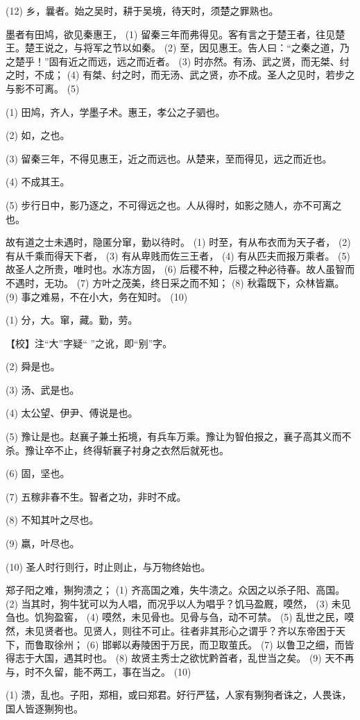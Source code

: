 \documentclass[12pt,UTF8]{ctexbook}
\begin{document}
(12) 乡，曩者。始之吴时，耕于吴境，待天时，须楚之罪熟也。

墨者有田鸠，欲见秦惠王， (1) 留秦三年而弗得见。客有言之于楚王者，往见楚王。楚王说之，与将军之节以如秦。 (2) 至，因见惠王。告人曰：“之秦之道，乃之楚乎！”固有近之而远，远之而近者。 (3) 时亦然。有汤、武之贤，而无桀、纣之时，不成； (4) 有桀、纣之时，而无汤、武之贤，亦不成。圣人之见时，若步之与影不可离。 (5)

(1) 田鸠，齐人，学墨子术。惠王，孝公之子驷也。

(2) 如，之也。

(3) 留秦三年，不得见惠王，近之而远也。从楚来，至而得见，远之而近也。

(4) 不成其王。

(5) 步行日中，影乃逐之，不可得远之也。人从得时，如影之随人，亦不可离之也。

故有道之士未遇时，隐匿分窜，勤以待时。 (1) 时至，有从布衣而为天子者， (2) 有从千乘而得天下者， (3) 有从卑贱而佐三王者， (4) 有从匹夫而报万乘者。 (5) 故圣人之所贵，唯时也。水冻方固， (6) 后稷不种，后稷之种必待春。故人虽智而不遇时，无功。 (7) 方叶之茂美，终日采之而不知； (8) 秋霜既下，众林皆羸。 (9) 事之难易，不在小大，务在知时。 (10)

(1) 分，大。窜，藏。勤，劳。

【校】注“大”字疑“ ”之讹，即“别”字。

(2) 舜是也。

(3) 汤、武是也。

(4) 太公望、伊尹、傅说是也。

(5) 豫让是也。赵襄子兼土拓境，有兵车万乘。豫让为智伯报之，襄子高其义而不杀。豫让卒不止，终得斩襄子衬身之衣然后就死也。

(6) 固，坚也。

(7) 五稼非春不生。智者之功，非时不成。

(8) 不知其叶之尽也。

(9) 羸，叶尽也。

(10) 圣人时行则行，时止则止，与万物终始也。

郑子阳之难，猘狗溃之； (1) 齐高国之难，失牛溃之。众因之以杀子阳、高国。 (2) 当其时，狗牛犹可以为人唱，而况乎以人为唱乎？饥马盈厩，嗼然， (3) 未见刍也。饥狗盈窖， (4) 嗼然，未见骨也。见骨与刍，动不可禁。 (5) 乱世之民，嗼然，未见贤者也。见贤人，则往不可止。往者非其形心之谓乎？齐以东帝困于天下，而鲁取徐州； (6) 邯郸以寿陵困于万民，而卫取茧氏。 (7) 以鲁卫之细，而皆得志于大国，遇其时也。 (8) 故贤主秀士之欲忧黔首者，乱世当之矣。 (9) 天不再与，时不久留，能不两工，事在当之。 (10)

(1) 溃，乱也。子阳，郑相，或曰郑君。好行严猛，人家有猘狗者诛之，人畏诛，国人皆逐猘狗也。
\end{document}
